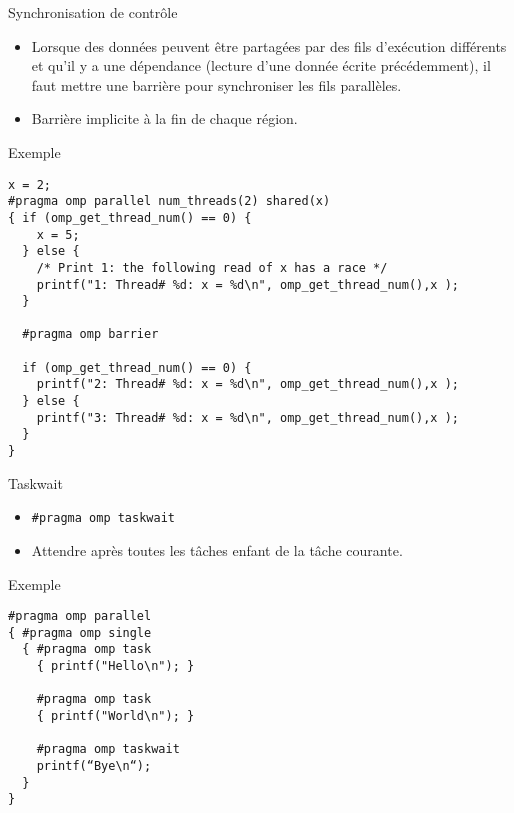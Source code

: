\documentclass[10pt]{beamer}
\begin{document}
\begin{frame}{Synchronisation de contrôle}

  \begin{itemize}
    \item Lorsque des données peuvent être partagées par des fils d'exécution différents et qu'il y a une dépendance (lecture d'une donnée écrite précédemment), il faut mettre une barrière pour synchroniser les fils parallèles.

    \item Barrière implicite à la fin de chaque région.
  \end{itemize}
\end{frame}

\begin{frame}[fragile]{Exemple}

  \scriptsize
  \begin{verbatim}
x = 2;
#pragma omp parallel num_threads(2) shared(x)
{ if (omp_get_thread_num() == 0) { 
    x = 5; 
  } else {
    /* Print 1: the following read of x has a race */
    printf("1: Thread# %d: x = %d\n", omp_get_thread_num(),x );
  }

  #pragma omp barrier

  if (omp_get_thread_num() == 0) {
    printf("2: Thread# %d: x = %d\n", omp_get_thread_num(),x );
  } else {
    printf("3: Thread# %d: x = %d\n", omp_get_thread_num(),x );
  }
}
  \end{verbatim}
\end{frame}

\begin{frame}[fragile]{Taskwait}

  \begin{itemize}
    \item \verb|#pragma omp taskwait|

    \item Attendre après toutes les tâches enfant de la tâche courante.
  \end{itemize}
\end{frame}

\begin{frame}[fragile]{Exemple}

  \begin{verbatim}
#pragma omp parallel
{ #pragma omp single
  { #pragma omp task
    { printf("Hello\n"); }

    #pragma omp task
    { printf("World\n"); }

    #pragma omp taskwait
    printf(“Bye\n“);
  }
}
  \end{verbatim}
\end{frame}
\end{document}
